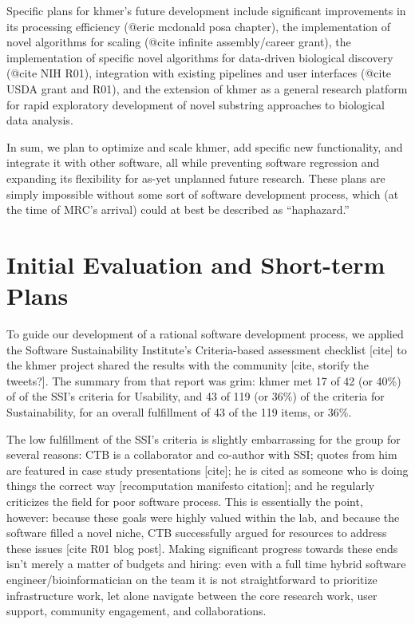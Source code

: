 \documentclass[11pt]{article}
\begin{document}
Specific plans for khmer's future development include significant
improvements in its processing efficiency (@eric mcdonald posa
chapter), the implementation of novel algorithms for scaling (@cite
infinite assembly/career grant), the implementation of specific novel
algorithms for data-driven biological discovery (@cite NIH R01),
integration with existing pipelines and user interfaces (@cite USDA
grant and R01), and the extension of khmer as a general research
platform for rapid exploratory development of novel substring
approaches to biological data analysis.

In sum, we plan to optimize and scale khmer, add specific new
functionality, and integrate it with other software, all while
preventing software regression and expanding its flexibility for
as-yet unplanned future research.  These plans are simply impossible
without some sort of software development process, which (at the time
of MRC's arrival) could at best be described as ``haphazard.''

\section{Initial Evaluation and Short-term Plans}

To guide our development of a rational software development process,
we applied the Software Sustainability Institute's Criteria-based
assessment checklist [cite] to the khmer project shared the results
with the community [cite, storify the tweets?]. The summary from that
report was grim: khmer met 17 of 42 (or 40\%) of of the SSI's criteria
for Usability, and 43 of 119 (or 36\%) of the criteria for
Sustainability, for an overall fulfillment of 43 of the 119 items, or
36\%.

The low fulfillment of the SSI's criteria is slightly embarrassing for
the group for several reasons: CTB is a collaborator and co-author
with SSI; quotes from him are featured in case study presentations
[cite]; he is cited as someone who is doing things the correct way
[recomputation manifesto citation]; and he regularly criticizes the
field for poor software process.  This is essentially the point,
however: because these goals were highly valued within the lab, and
because the software filled a novel niche, CTB successfully argued for
resources to address these issues [cite R01 blog post].  Making
significant progress towards these ends isn't merely a matter of
budgets and hiring: even with a full time hybrid software
engineer/bioinformatician on the team it is not straightforward to
prioritize infrastructure work, let alone navigate between the core
research work, user support, community engagement, and collaborations.
\end{document}
